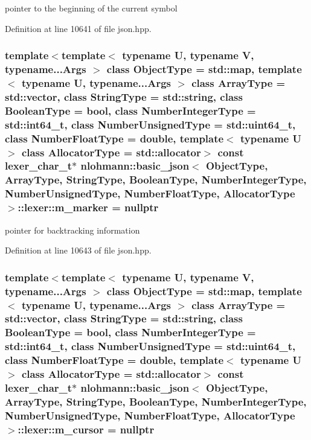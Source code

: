 pointer to the beginning of the current symbol 



Definition at line 10641 of file json.\+hpp.

\hypertarget{classnlohmann_1_1basic__json_1_1lexer_a996cc0634a78006085d2e9a5c0c8ecb7}{}
\subsubsection[{m\+\_\+marker}]{\setlength{\rightskip}{0pt plus 5cm}template$<$template$<$ typename U, typename V, typename...\+Args $>$ class Object\+Type = std\+::map, template$<$ typename U, typename...\+Args $>$ class Array\+Type = std\+::vector, class String\+Type  = std\+::string, class Boolean\+Type  = bool, class Number\+Integer\+Type  = std\+::int64\+\_\+t, class Number\+Unsigned\+Type  = std\+::uint64\+\_\+t, class Number\+Float\+Type  = double, template$<$ typename U $>$ class Allocator\+Type = std\+::allocator$>$ const {\bf lexer\+\_\+char\+\_\+t}$\ast$ {\bf nlohmann\+::basic\+\_\+json}$<$ Object\+Type, Array\+Type, String\+Type, Boolean\+Type, Number\+Integer\+Type, Number\+Unsigned\+Type, Number\+Float\+Type, Allocator\+Type $>$\+::lexer\+::m\+\_\+marker = nullptr\hspace{0.3cm}{\ttfamily [private]}}\label{classnlohmann_1_1basic__json_1_1lexer_a996cc0634a78006085d2e9a5c0c8ecb7}


pointer for backtracking information 



Definition at line 10643 of file json.\+hpp.

\hypertarget{classnlohmann_1_1basic__json_1_1lexer_a990b28993e1136d8a859ced7223ea592}{}
\subsubsection[{m\+\_\+cursor}]{\setlength{\rightskip}{0pt plus 5cm}template$<$template$<$ typename U, typename V, typename...\+Args $>$ class Object\+Type = std\+::map, template$<$ typename U, typename...\+Args $>$ class Array\+Type = std\+::vector, class String\+Type  = std\+::string, class Boolean\+Type  = bool, class Number\+Integer\+Type  = std\+::int64\+\_\+t, class Number\+Unsigned\+Type  = std\+::uint64\+\_\+t, class Number\+Float\+Type  = double, template$<$ typename U $>$ class Allocator\+Type = std\+::allocator$>$ const {\bf lexer\+\_\+char\+\_\+t}$\ast$ {\bf nlohmann\+::basic\+\_\+json}$<$ Object\+Type, Array\+Type, String\+Type, Boolean\+Type, Number\+Integer\+Type, Number\+Unsigned\+Type, Number\+Float\+Type, Allocator\+Type $>$\+::lexer\+::m\+\_\+cursor = nullptr\hspace{0.3cm}{\ttfamily [private]}}\label{classnlohmann_1_1basic__json_1_1lexer_a990b28993e1136d8a859ced7223ea592}


